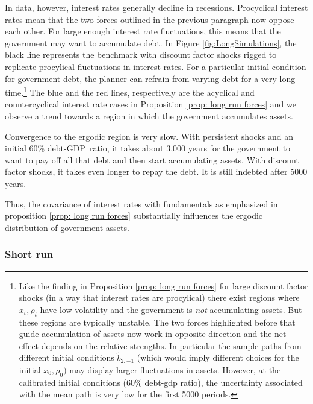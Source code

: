 \documentclass[thmsb,11pt]{article}
\begin{document}
{In data, however, interest rates  generally decline in recessions. Procyclical interest rates mean that the
two forces outlined in the previous paragraph now oppose each other.  For  large enough interest rate fluctuations, this means that
the
government may want to accumulate debt. In Figure \ref{fig:LongSimulations}, the
black line represents the benchmark with discount factor shocks rigged to
replicate  procylical fluctuations in interest rates. For a particular initial condition for government debt,
the planner can refrain from varying debt for a very  long time.\footnote{Like the finding in Proposition \ref{prop: long run forces} for large discount factor shocks (in a way that interest rates are procylical)  there exist
regions where $x_t,\rho_t$ have low volatility and the  government is \emph{not} accumulating assets. But these
regions  are typically unstable. The two forces highlighted before that guide accumulation of assets now work in opposite direction and the net effect depends
on the relative strengths. In particular the sample paths from different initial conditions $\tilde{b}_{2,-1}$ (which would imply different choices for the initial $x_0,\rho_0)$ may display larger fluctuations in assets. However, at the calibrated initial conditions ($60\%$ debt-gdp ratio), the uncertainty associated with the mean path is very low for the first 5000 periods.} The blue and the red lines, respectively are the acyclical and countercyclical interest rate cases in Proposition \ref{prop: long run forces} and we observe a trend towards a region in which the government accumulates assets.



Convergence to the ergodic region is  very slow.  With persistent shocks and an initial 60\% debt-GDP\ ratio,  it takes about 3,000 years for
the government to want to pay off all that debt
and then start accumulating assets. With
discount factor shocks, it takes even longer to repay the debt. It is still indebted after 5000 years.

Thus, the covariance of interest rates with fundamentals as emphasized in proposition \ref{prop: long run forces} substantially influences the ergodic distribution of government assets.

\subsubsection{Short run}

}
\end{document}
